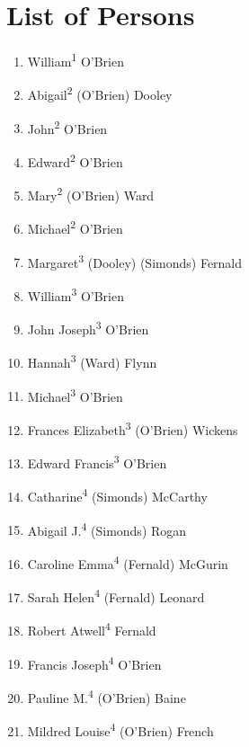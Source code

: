 \chapter{List of Persons}
\begin{enumerate}
	\item\label{per:William1OBrien}William\textsuperscript{1} O'Brien
	\item\label{per:Abigail2OBrien}Abigail\textsuperscript{2} (O'Brien) Dooley
	\item\label{per:John2OBrien}John\textsuperscript{2} O'Brien
	\item\label{per:Edward2OBrien}Edward\textsuperscript{2} O'Brien
	\item\label{per:Mary2OBrien}Mary\textsuperscript{2} (O'Brien) Ward
	\item\label{per:Michael2OBrien}Michael\textsuperscript{2} O'Brien
	\item\label{per:Margaret3Dooley}Margaret\textsuperscript{3} (Dooley) (Simonds) Fernald
	\item\label{per:William3OBrien}William\textsuperscript{3} O'Brien
	\item\label{per:John3OBrien}John Joseph\textsuperscript{3} O'Brien
	\item\label{per:Hannah3Ward}Hannah\textsuperscript{3} (Ward) Flynn
	\item\label{per:Michael3OBrien}Michael\textsuperscript{3} O'Brien
	\item\label{per:Frances3OBrien}Frances Elizabeth\textsuperscript{3} (O'Brien) Wickens
	\item\label{per:Edward3OBrien}Edward Francis\textsuperscript{3} O'Brien
	\item\label{per:Catharine4Simonds}Catharine\textsuperscript{4} (Simonds) McCarthy
	\item\label{per:Abigail4Simonds}Abigail J.\textsuperscript{4} (Simonds) Rogan
	\item\label{per:Caroline4Fernald}Caroline Emma\textsuperscript{4} (Fernald) McGurin
	\item\label{per:Sarah4Fernald}Sarah Helen\textsuperscript{4} (Fernald) Leonard
	\item\label{per:Robert4Fernald}Robert Atwell\textsuperscript{4} Fernald
	\item\label{per:Francis4OBrien}Francis Joseph\textsuperscript{4} O'Brien
	\item\label{per:Pauline4OBrien}Pauline M.\textsuperscript{4} (O'Brien) Baine
	\item\label{per:Mildred4OBrien}Mildred Louise\textsuperscript{4} (O'Brien) French

\end{enumerate}
